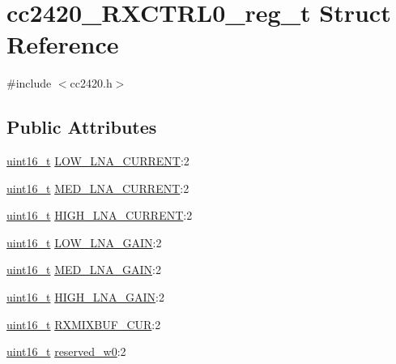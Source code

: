 \hypertarget{structcc2420___r_x_c_t_r_l0__reg__t}{}\section{cc2420\+\_\+\+R\+X\+C\+T\+R\+L0\+\_\+reg\+\_\+t Struct Reference}
\label{structcc2420___r_x_c_t_r_l0__reg__t}


{\ttfamily \#include $<$cc2420.\+h$>$}

\subsection*{Public Attributes}
\begin{DoxyCompactItemize}
\item 
\hyperlink{_p_e___types_8h_a1f1825b69244eb3ad2c7165ddc99c956}{uint16\+\_\+t} \hyperlink{structcc2420___r_x_c_t_r_l0__reg__t_a26480f3a9a3044c27e51f114d9e6efa4}{L\+O\+W\+\_\+\+L\+N\+A\+\_\+\+C\+U\+R\+R\+E\+NT}\+:2
\item 
\hyperlink{_p_e___types_8h_a1f1825b69244eb3ad2c7165ddc99c956}{uint16\+\_\+t} \hyperlink{structcc2420___r_x_c_t_r_l0__reg__t_af79f78937de2c21cd5206543386a4164}{M\+E\+D\+\_\+\+L\+N\+A\+\_\+\+C\+U\+R\+R\+E\+NT}\+:2
\item 
\hyperlink{_p_e___types_8h_a1f1825b69244eb3ad2c7165ddc99c956}{uint16\+\_\+t} \hyperlink{structcc2420___r_x_c_t_r_l0__reg__t_af60e7a34aaed97f20392a308814a9590}{H\+I\+G\+H\+\_\+\+L\+N\+A\+\_\+\+C\+U\+R\+R\+E\+NT}\+:2
\item 
\hyperlink{_p_e___types_8h_a1f1825b69244eb3ad2c7165ddc99c956}{uint16\+\_\+t} \hyperlink{structcc2420___r_x_c_t_r_l0__reg__t_a1ba1308dc07372a4afae6994906d8cf9}{L\+O\+W\+\_\+\+L\+N\+A\+\_\+\+G\+A\+IN}\+:2
\item 
\hyperlink{_p_e___types_8h_a1f1825b69244eb3ad2c7165ddc99c956}{uint16\+\_\+t} \hyperlink{structcc2420___r_x_c_t_r_l0__reg__t_a537f55cd6361050f69c4c3d86086a84b}{M\+E\+D\+\_\+\+L\+N\+A\+\_\+\+G\+A\+IN}\+:2
\item 
\hyperlink{_p_e___types_8h_a1f1825b69244eb3ad2c7165ddc99c956}{uint16\+\_\+t} \hyperlink{structcc2420___r_x_c_t_r_l0__reg__t_ad7aeb2d983f5f68d8a356f367f72a1fd}{H\+I\+G\+H\+\_\+\+L\+N\+A\+\_\+\+G\+A\+IN}\+:2
\item 
\hyperlink{_p_e___types_8h_a1f1825b69244eb3ad2c7165ddc99c956}{uint16\+\_\+t} \hyperlink{structcc2420___r_x_c_t_r_l0__reg__t_a89b8596f6ee46f26fe2db5790141ec6d}{R\+X\+M\+I\+X\+B\+U\+F\+\_\+\+C\+UR}\+:2
\item 
\hyperlink{_p_e___types_8h_a1f1825b69244eb3ad2c7165ddc99c956}{uint16\+\_\+t} \hyperlink{structcc2420___r_x_c_t_r_l0__reg__t_aaabef9114f7c91e663035dbaaba1da45}{reserved\+\_\+w0}\+:2
\end{DoxyCompactItemize}


